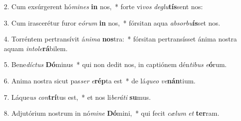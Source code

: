 2. Cum exsúrgerent hó\textit{mi}\textit{nes} \textbf{in} nos,~*  forte vi\textit{vos} \textit{de}\textit{glu}\textbf{tís}sent nos:\

3. Cum irascerétur furor e\textit{ó}\textit{rum} \textbf{in} nos,~*  fórsitan aqua \textit{ab}\textit{sor}\textit{bu}\textbf{ís}set nos.\

4. Torréntem pertransívit á\textit{ni}\textit{ma} \textbf{nos}tra:~*  fórsitan pertransísset ánima nostra aquam \textit{in}\textit{to}\textit{le}\textbf{rá}bilem.\

5. Bene\textit{díc}\textit{tus} \textbf{Dó}minus~*  qui non dedit nos, in captiónem dén\textit{ti}\textit{bus} \textit{e}\textbf{ó}rum.\

6. Anima nostra sicut pas\textit{ser} \textit{e}\textbf{rép}ta est~*  de lá\textit{que}\textit{o} \textit{ve}\textbf{nán}tium.\

7. Láque\textit{us} \textit{con}\textbf{trí}tus est,~*  et nos li\textit{be}\textit{rá}\textit{ti} \textbf{su}mus.\

8. Adjutórium nostrum in nó\textit{mi}\textit{ne} \textbf{Dó}mini,~*  qui fecit \textit{cæ}\textit{lum} \textit{et} \textbf{ter}ram.\

